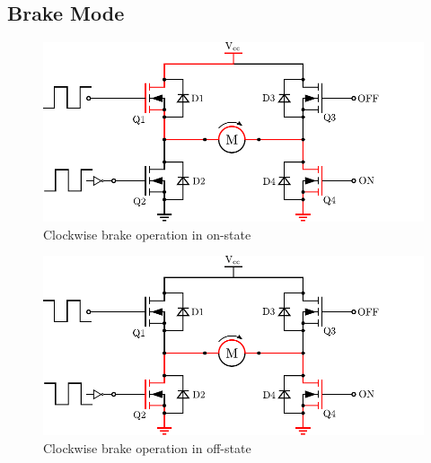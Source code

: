 \subsection{Brake Mode}

\begin{figure}[H]
	\centering
	\includegraphics[scale=.6]{figures/HbridgeClockwiseBrakeON.pdf}
	\flushleft
	\caption{Clockwise brake operation in on-state}
	\label{HbridgeClockwiseBrakeON}
\end{figure}

\begin{figure}[H]
	\centering
	\includegraphics[scale=.6]{figures/HbridgeClockwiseBrakeOFF.pdf}
	\flushleft
	\caption{Clockwise brake operation in off-state}
	\label{HbridgeClockwiseBrakeOFF}
\end{figure}